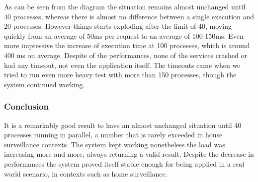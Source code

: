 As can be seen from the diagram the situation remains almost unchanged until 40 processes,
whereas there is almost no difference between a single execution and 20 processes. However
things starts exploding after the limit of 40, moving quickly from an average of 50ms per request
to an average of 100-150ms. Even more impressive the increase of execution time at 100 processes, which is around
400 ms on average.\newline
Despite of the performances, none of the services crashed or had any timeout, not even the application itself. The timeouts
came when we tried to run even more heavy test with more than 150 processes, though the system continued working.\newline

\subsubsection{Conclusion}

It is a remarkably good result to have an almost unchanged situation until 40 processes running in parallel,
a number that is rarely exceeded in house surveillance contexts. The system kept working nonetheless the
load was increasing more and more, always returning a valid result. Despite the decrease in performances
the system proved itself stable enough for being applied in a real world scenario, in contexts
such as home surveillance.
